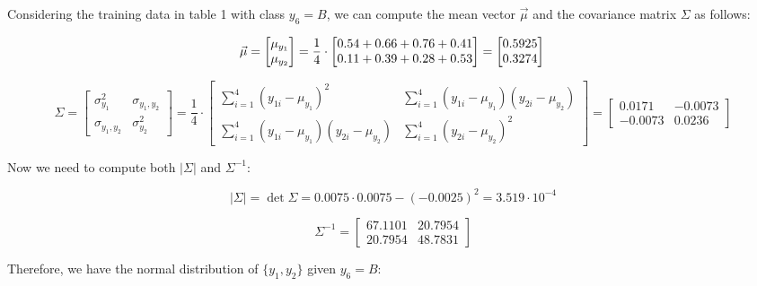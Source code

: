 \documentclass{article}
\begin{document}
Considering the training data in table 1 with class $y_6=B$, we can compute the mean vector $\vec{\mu}$ and the covariance matrix $\Sigma$ as follows:

\[
  \vec{\mu} =  \left[\begin{matrix} \mu_{y_1} \\ \mu_{y_2} \end{matrix} \right]= \frac{1}{4} \cdot 
  \left[\begin{matrix}
    0.54 + 0.66 + 0.76 + 0.41 \\
    0.11 + 0.39 + 0.28 + 0.53
  \end{matrix}\right] = \left[\begin{matrix}
    0.5925 \\
    0.3274
  \end{matrix}\right] \\
\]

\[
  \Sigma = \left[ \begin{matrix}
    \sigma_{y_1}^2 & \sigma_{y_1,y_2} \\
    \sigma_{y_1,y_2} & \sigma_{y_2}^2
  \end{matrix} \right] = \frac{1}{4} \cdot \begin{bmatrix}
    \sum_{i=1}^{4} (y_{1i} - \mu_{y_1})^2 & \sum_{i=1}^{4} (y_{1i} - \mu_{y_1})(y_{2i} - \mu_{y_2}) \\
    \sum_{i=1}^{4} (y_{1i} - \mu_{y_1})(y_{2i} - \mu_{y_2}) & \sum_{i=1}^{4} (y_{2i} - \mu_{y_2})^2
  \end{bmatrix}  = \begin{bmatrix}
    0.0171 & -0.0073 \\
    -0.0073 & 0.0236
  \end{bmatrix}
\]

Now we need to compute both $|\Sigma|$ and $\Sigma^{-1}$:

\[
  |\Sigma| = \det \Sigma = 0.0075 \cdot 0.0075 - (-0.0025)^2 = 3.519 \cdot 10^{-4}
\]

\[
  \Sigma^{-1} = \begin{bmatrix}
    67.1101 & 20.7954 \\
    20.7954 & 48.7831
  \end{bmatrix}
\]

Therefore, we have the normal distribution of $\{y_1,y_2\}$ given $y_6=B$:
\end{document}
